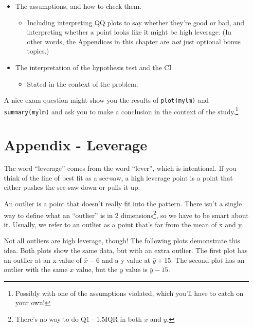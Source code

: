 \documentclass[
  letterpaper,
  DIV=11,
  numbers=noendperiod,
  oneside]{scrreprt}
\providecommand{\tightlist}{%
  \setlength{\itemsep}{0pt}\setlength{\parskip}{0pt}}\usepackage{longtable,booktabs,array}
\begin{document}
\begin{itemize}
\tightlist
\item
  The assumptions, and how to check them.

  \begin{itemize}
  \tightlist
  \item
    Including interpreting QQ plots to say whether they're good or bad,
    and interpreting whether a point looks like it might be high
    leverage. (In other words, the Appendices in this chapter are
    \emph{not} just optional bonus topics.)
  \end{itemize}
\item
  The interpretation of the hypothesis test and the CI

  \begin{itemize}
  \tightlist
  \item
    Stated in the context of the problem.
  \end{itemize}
\end{itemize}

A nice exam question might show you the results of \texttt{plot(mylm)}
and \texttt{summary(mylm)} and ask you to make a conclusion in the
context of the study.\footnote{Possibly with one of the assumptions
  violated, which you'll have to catch on your own!}

\hypertarget{appendix---leverage}{%
\section{Appendix - Leverage}\label{appendix---leverage}}

The word ``leverage'' comes from the word ``lever'', which is
intentional. If you think of the line of best fit as a see-saw, a high
leverage point is a point that either pushes the see-saw down or pulls
it up.

An outlier is a point that doesn't really fit into the pattern. There
isn't a single way to define what an ``outlier'' is in 2
dimensions\footnote{There's no way to do Q1 - 1.5IQR in both \(x\) and
  \(y\).}, so we have to be smart about it. Usually, we refer to an
outlier as a point that's far from the mean of x and y.

Not all outliers are high leverage, though! The following plots
demonstrate this idea. Both plots show the same data, but with an extra
outlier. The first plot has an outlier at an x value of \(\bar x - 6\)
and a y value at \(\bar y + 15\). The second plot has an outlier with
the same \(x\) value, but the \(y\) value is \(\bar y - 15\).
\end{document}
